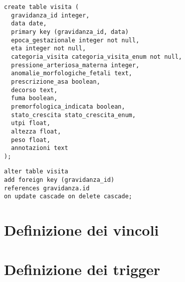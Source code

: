 \begin{lstlisting}[float,caption={Definizione della tabella \tab{visita}.},label=ptabvisita]
create table visita (
  gravidanza_id integer,
  data date,
  primary key (gravidanza_id, data)
  epoca_gestazionale integer not null,
  eta integer not null,
  categoria_visita categoria_visita_enum not null,
  pressione_arteriosa_materna integer,
  anomalie_morfologiche_fetali text,
  prescrizione_asa boolean,
  decorso text,
  fuma boolean,
  premorfologica_indicata boolean,
  stato_crescita stato_crescita_enum,
  utpi float,
  altezza float,
  peso float,
  annotazioni text
);
\end{lstlisting}

\begin{lstlisting}[float,caption={Definizione del vincolo di chiave esterna nella tabella \tab{visita}.},label=pconvisita]
alter table visita
add foreign key (gravidanza_id)
references gravidanza.id
on update cascade on delete cascade;
\end{lstlisting}

\section{Definizione dei vincoli}

\section{Definizione dei trigger}